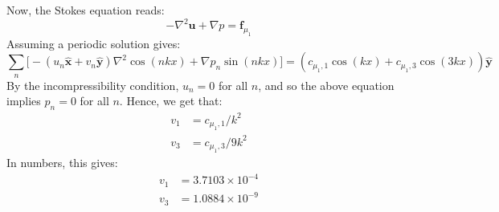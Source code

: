 \documentclass[reqno]{article}
\begin{document}
Now, the Stokes equation reads:
\begin{equation}
  -\nabla^2 \mathbf{u} + \nabla p = \mathbf{f}_{\mu_1}
\end{equation}
Assuming a periodic solution gives:
\begin{equation}
  \sum_n \biggl[
  -\left( u_n \mathbf{\hat{x}} + v_n \mathbf{\hat{y}} \right) \nabla^2 \cos(nkx)
  + \nabla p_n \sin(nkx)
  \biggr]
  =
  \left(
    c_{\mu_1, 1} \cos(kx) + c_{\mu_1, 3} \cos(3kx)
  \right) \mathbf{\hat{y}}
\end{equation}
By the incompressibility condition, $u_n = 0$ for all $n$, and so the above
equation implies $p_n = 0$ for all $n$.
Hence, we get that:
\begin{align}
  v_1 &= c_{\mu_1, 1} / k^2 \\
  v_3 &= c_{\mu_1, 3} / 9 k^2
\end{align}
In numbers, this gives:
\begin{align}
  v_1 &= 3.7103 \times 10^{-4} \\
  v_3 &= 1.0884 \times 10^{-9}
\end{align}
\end{document}
